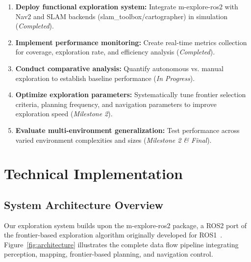 \documentclass[conference]{IEEEtran}
\begin{document}
\begin{enumerate}
\item \textbf{Deploy functional exploration system:} Integrate m-explore-ros2 with Nav2 and SLAM backends (slam\_toolbox/cartographer) in simulation (\textit{Completed}).

\item \textbf{Implement performance monitoring:} Create real-time metrics collection for coverage, exploration rate, and efficiency analysis (\textit{Completed}).

\item \textbf{Conduct comparative analysis:} Quantify autonomous vs. manual exploration to establish baseline performance (\textit{In Progress}).

\item \textbf{Optimize exploration parameters:} Systematically tune frontier selection criteria, planning frequency, and navigation parameters to improve exploration speed (\textit{Milestone 2}).

\item \textbf{Evaluate multi-environment generalization:} Test performance across varied environment complexities and sizes (\textit{Milestone 2 \& Final}).
\end{enumerate}

\section{Technical Implementation}

\subsection{System Architecture Overview}

Our exploration system builds upon the m-explore-ros2 package, a ROS2 port of the frontier-based exploration algorithm originally developed for ROS1~\cite{horner2016exploration}. Figure~\ref{fig:architecture} illustrates the complete data flow pipeline integrating perception, mapping, frontier-based planning, and navigation control.
\end{document}
